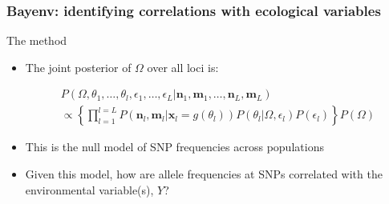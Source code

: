 \begin{frame}
\frametitle{Bayenv: identifying correlations with ecological
variables}
\begin{block}{The method}
\begin{itemize}
\item{The joint posterior of $\Omega$ over all loci is:}

\begin{multline}
P(\Omega, \theta_1, \ldots , \theta_l, 
\epsilon_1, \ldots , \epsilon_L | 
\bm{n}_1, \bm{m}_1, \ldots , \bm{n}_L, \bm{m}_L) \\
\propto \left \{ \prod_{l=1}^{l=L}P(\bm{n}_l,\bm{m}_l | \bm{x}_l = g(\theta_l))
P(\theta_l | \Omega,\epsilon_l)P(\epsilon_l)
\right \}P(\Omega)	
\end{multline}

\item{This is the null model of SNP frequencies across populations}
\item{Given this model, how are allele frequencies at SNPs correlated with 
the environmental variable(s), $Y$?}

\end{itemize}
\end{block}
\end{frame}































